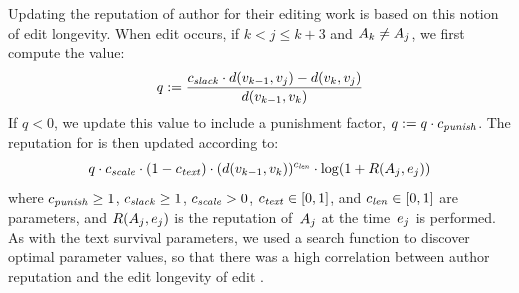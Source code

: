   Updating the reputation of author  for their editing
  work is based on this notion of edit longevity.
  When edit  occurs, if
  $k < j \le k+3$ and $A_{k} \ne A_{j}$,
  we first compute the value:
  \begin{equation*}
  	q := \frac{ {c_{{\text{\textit{slack}}}}} \cdot d(v_{k-1},v_{j})
		- d(v_{k},v_{j}) }
		{ d(v_{k-1},v_{k}) }
  \end{equation*}
  If $q < 0$, we update this value to include a punishment factor,
  $q := q \cdot {c_{{\text{\textit{punish}}}}}$.
  The reputation for  is then updated according to:
  \begin{equation*}
  	q \cdot {c_{{\text{\textit{scale}}}}} \cdot (1 - {c_{{\text{\textit{text}}}}}) \cdot
	        (d(v_{k-1},v_{k}))^{c_{{\text{\textit{len}}}}}
		\cdot \log(1 + R(A_{j},e_{j}))
  \end{equation*}
  where ${c_{{\text{\textit{punish}}}}} \geq 1$, ${c_{{\text{\textit{slack}}}}} \geq 1$, ${c_{{\text{\textit{scale}}}}} > 0$,
  ${c_{{\text{\textit{text}}}}} \in [0,1]$, and ${c_{{\text{\textit{len}}}}} \in [0,1]$ are parameters,
  and $R(A_{j},e_{j})$ is the reputation
  of~$A_{j}$ at the time~$e_{j}$ is performed.
  As with the text survival parameters, we used a search function
  to discover optimal parameter values, so that there was a high
  correlation between author reputation and the edit longevity
  of edit .

